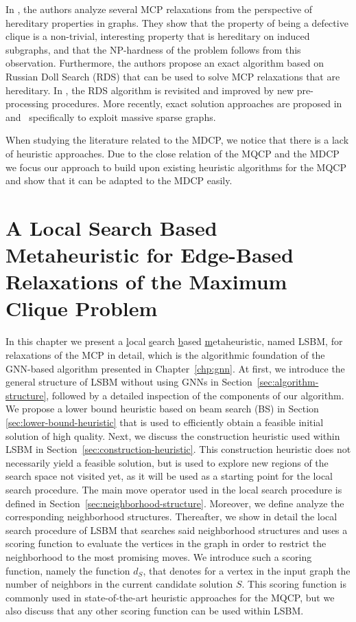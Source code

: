 \documentclass[draft,final]{vutinfth} %
\begin{document}
In \cite{Trukhanov2013}, the authors analyze several MCP relaxations from the perspective of hereditary properties in graphs. They show that the property of being a defective clique is a non-trivial, interesting property that is hereditary on induced subgraphs, and that the NP-hardness of the problem follows from this observation. Furthermore, the authors propose an exact algorithm based on Russian Doll Search (RDS) that can be used to solve MCP relaxations that are hereditary. In \cite{GSCHWIND2018131}, the RDS algorithm is revisited and improved by new pre-processing procedures. 
More recently, exact solution approaches are proposed in~\cite{chen2021computing} and~\cite{gao2022exact} specifically to exploit massive sparse graphs. 

When studying the literature related to the MDCP, we notice that there is a lack of heuristic approaches. Due to the close relation of the MQCP and the MDCP we focus our approach to build upon existing heuristic algorithms for the MQCP and show that it can be adapted to the MDCP easily. 

\chapter{A Local Search Based Metaheuristic for Edge-Based Relaxations of the Maximum Clique Problem}\label{chp:local-search-algorithm}

In this chapter we present a \underline{l}ocal \underline{s}earch \underline{b}ased \underline{m}etaheuristic, named LSBM, for relaxations of the MCP in detail, which is the algorithmic foundation of the GNN-based algorithm presented in Chapter~\ref{chp:gnn}. 
At first, we introduce the general structure of LSBM without using GNNs in Section~\ref{sec:algorithm-structure}, followed by a detailed inspection of the components of our algorithm. We propose a lower bound heuristic based on beam search (BS) in Section \ref{sec:lower-bound-heuristic} that is used to efficiently obtain a feasible initial solution of high quality. 
Next, we discuss the construction heuristic used within LSBM in Section~\ref{sec:construction-heuristic}. This construction heuristic does not necessarily yield a feasible solution, but is used to explore new regions of the search space not visited yet, as it will be used as a starting point for the local search procedure. 
The main move operator used in the local search procedure is defined in Section~\ref{sec:neighborhood-structure}. Moreover, we define analyze the corresponding neighborhood structures. 
Thereafter, we show in detail the local search procedure of LSBM that searches said neighborhood structures and uses a scoring function to evaluate the vertices in the graph in order to restrict the neighborhood to the most promising moves. We introduce such a scoring function, namely the function $d_S$, that denotes for a vertex in the input graph the number of neighbors in the current candidate solution $S$. This scoring function is commonly used in state-of-the-art heuristic approaches for the MQCP, but we also discuss that any other scoring function can be used within LSBM. 
\end{document}
